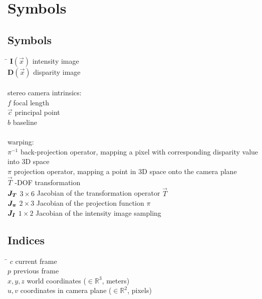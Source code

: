 \chapter*{Symbols}
\label{sec:symbols}

\section*{Symbols}

\begin{tabbing}
 \hspace*{1.6cm} \= \kill
 $\mathbf{I}(\vec{x})$          \> intensity image \\[0.5ex]
 $\mathbf{D}(\vec{x})$          \> disparity image \\[0.5ex]
 \\
 stereo camera intrinsics: \\
 $f$                            \> focal length \\[0.5ex]
 $\vec{c}$                      \> principal point \\[0.5ex]
 $b$                            \> baseline \\[0.5ex]
 \\
 warping: \\
 $\pi^{-1}$                     \> back-projection operator, mapping a pixel with corresponding disparity value into 3D space \\[0.5ex]
 $\pi$                          \> projection operator, mapping a point in 3D space onto the camera plane \\[0.5ex]
 $\vec{T}$                      -DOF transformation \\[0.5ex]
 $\mat{J_T}$                    \> $3 \times 6$ Jacobian of the transformation operator $\vec{T}$ \\[0.5ex]
 $\mat{J_{\pi}}$                    \> $2 \times 3$ Jacobian of the projection function $\pi$ \\[0.5ex]
 $\mat{J_I}$                    \> $1 \times 2$ Jacobian of the intensity image sampling \\[0.5ex]
\end{tabbing}

\section*{Indices}
\begin{tabbing}
 \hspace*{1.6cm}  \= \kill
 $c$ \> current frame \\[0.5ex]
 $p$ \> previous frame \\[0.5ex]
 $x, y, z$ \> world coordinates ($\in \mathbb{R}^3$, \unit{meters}) \\[0.5ex]
 $u, v$ \> coordinates in camera plane ($\in \mathbb{R}^2$, \unit{pixels}) \\[0.5ex]

\end{tabbing}

